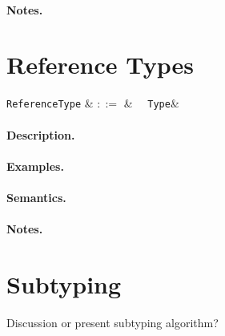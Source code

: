 \paragraph{Notes.}


\section{Reference Types}

\begin{syntax}
  \verb+ReferenceType+ & $::=$ & \token{\&}\ \ \verb+Type+&\\
\end{syntax}

\paragraph{Description.}

\paragraph{Examples.}

\paragraph{Semantics.}

\paragraph{Notes.}

\section{Subtyping}
Discussion or present subtyping algorithm?
